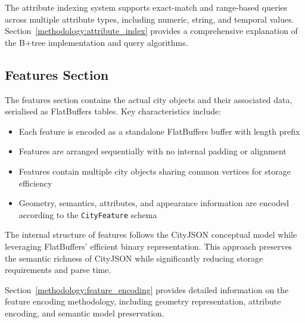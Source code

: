 The attribute indexing system supports exact-match and range-based queries across multiple attribute types, including numeric, string, and temporal values. Section~\ref{methodology:attribute_index} provides a comprehensive explanation of the B+tree implementation and query algorithms.

\subsection{Features Section}
\label{methodology:overview:features_section}

The features section contains the actual city objects and their associated data, serialised as FlatBuffers tables. Key characteristics include:

\begin{itemize}
  \item Each feature is encoded as a standalone FlatBuffers buffer with length prefix
  \item Features are arranged sequentially with no internal padding or alignment
  \item Features contain multiple city objects sharing common vertices for storage efficiency
  \item Geometry, semantics, attributes, and appearance information are encoded according to the \texttt{CityFeature} schema
\end{itemize}

The internal structure of features follows the CityJSON conceptual model while leveraging FlatBuffers' efficient binary representation. This approach preserves the semantic richness of CityJSON while significantly reducing storage requirements and parse time.

Section~\ref{methodology:feature_encoding} provides detailed information on the feature encoding methodology, including geometry representation, attribute encoding, and semantic model preservation.
